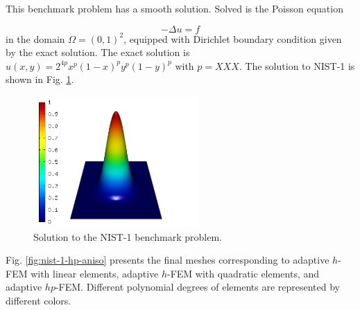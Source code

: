 \documentclass[12pt]{elsarticle}
\begin{document}
This benchmark problem has a smooth solution. 
Solved is the Poisson equation

\begin{equation} \label{poisson}
-\Delta u = f
\end{equation}
in the domain $\Omega = (0, 1)^2$, equipped with Dirichlet
boundary condition given by the exact solution.
The exact solution is $u(x, y) = 2^{4p}x^{p}(1-x)^{p}y^{p}(1-y)^{p}$
with $p = XXX$.
The solution to NIST-1 is shown in Fig. \ref{fig:sln-nist01}.

\begin{figure}[H]
\centering
\vspace{-3mm}
\includegraphics[height=5cm]{nist/nist-1/solution.png}
\vspace{-3mm}
\caption{Solution to the NIST-1 benchmark problem.}
\label{fig:sln-nist01}
\end{figure}


Fig. \ref{fig:nist-1-hp-aniso} presents the final meshes corresponding to adaptive $h$-FEM with 
linear elements, adaptive $h$-FEM with quadratic elements, and adaptive $hp$-FEM. Different 
polynomial degrees of elements are represented by different colors. 
\end{document}
